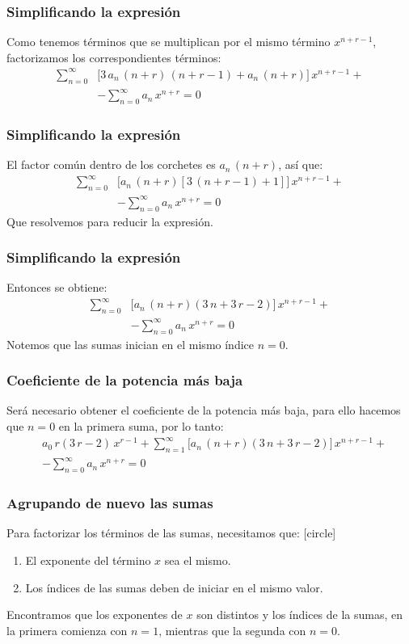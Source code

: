\documentclass[12pt]{beamer}
\begin{document}
\begin{frame}
\frametitle{Simplificando la expresión}
Como tenemos términos que se multiplican por el mismo término $x^{n+r-1}$, factorizamos los correspondientes términos:
\pause
\begin{align*}
\sum_{n=0}^{\infty} &\bigg[ 3 \, a_{n} \, (n + r) \, (n + r - 1) + a_{n} \, (n + r) \bigg] \, x^{n+r-1} + \\[1em]
&- \sum_{n=0}^{\infty} a_{n} \, x^{n+r} = 0
\end{align*}
\end{frame}
\begin{frame}
\frametitle{Simplificando la expresión}
El factor común dentro de los corchetes es $a_{n} \, (n + r)$, así que:
\pause
\begin{align*}
\sum_{n=0}^{\infty} &\bigg[ a_{n} \, (n + r) [3 \, (n + r - 1) + 1 ] \bigg] \, x^{n+r-1} + \\[1em]
&- \sum_{n=0}^{\infty} a_{n} \, x^{n+r} = 0
\end{align*}
\pause
Que resolvemos para reducir la expresión.
\end{frame}
\begin{frame}
\frametitle{Simplificando la expresión}
Entonces se obtiene:
\pause
\begin{align*}
\sum_{n=0}^{\infty} &\bigg[ a_{n} \, (n + r) (3 \, n +  3 \, r - 2 ) \bigg] \, x^{n+r-1} + \\[1em]
&- \sum_{n=0}^{\infty} a_{n} \, x^{n+r} = 0
\end{align*}
\pause
Notemos que las sumas inician en el mismo índice $n = 0$.
\end{frame}
\begin{frame}
\frametitle{Coeficiente de la potencia más baja}
Será necesario obtener el coeficiente de la potencia más baja, para ello hacemos que $n = 0$ en la primera suma, por lo tanto:
\begin{align*}
&a_{0} \, r (3 \, r {-}  2) \, x^{r-1} + \sum_{n=1}^{\infty} \bigg[ a_{n} \, (n {+} r) (3 \, n {+}  3 \, r {-} 2 ) \bigg] \, x^{n+r-1} + \\[1em]
&- \sum_{n=0}^{\infty} a_{n} \, x^{n+r} = 0
\end{align*}
\end{frame}
\begin{frame}
\frametitle{Agrupando de nuevo las sumas}
Para factorizar los términos de las sumas, necesitamos que:
[circle]
\begin{enumerate}[<+->]
\item El exponente del término $x$ sea el mismo.
\item Los índices de las sumas deben de iniciar en el mismo valor.
\end{enumerate}
\pause
Encontramos que los exponentes de $x$ son distintos y los índices de la sumas, en la primera comienza con $n = 1$, mientras que la segunda con $n = 0$.
\end{frame}
\end{document}
